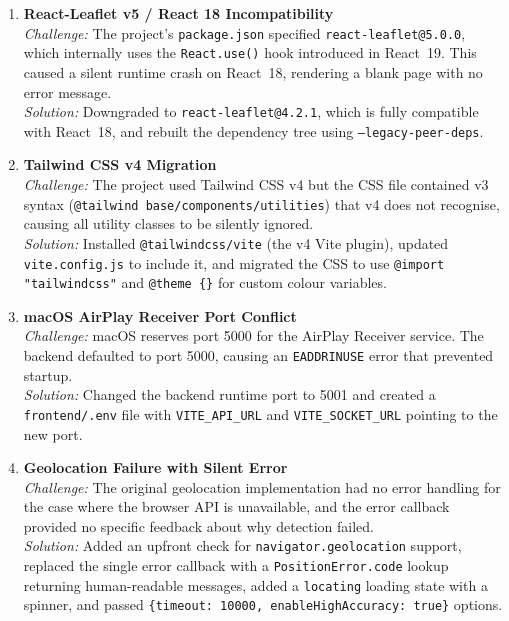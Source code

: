 \documentclass[12pt, a4paper]{report}
\begin{document}
\begin{enumerate}[leftmargin=*, label=\textbf{C\arabic*.}]

  \item \textbf{React-Leaflet v5 / React 18 Incompatibility}\\
  \textit{Challenge:} The project's \texttt{package.json} specified \texttt{react-leaflet@5.0.0}, which internally uses the \texttt{React.use()} hook introduced in React~19. This caused a silent runtime crash on React~18, rendering a blank page with no error message.\\[4pt]
  \textit{Solution:} Downgraded to \texttt{react-leaflet@4.2.1}, which is fully compatible with React~18, and rebuilt the dependency tree using \texttt{--legacy-peer-deps}.

  \item \textbf{Tailwind CSS v4 Migration}\\
  \textit{Challenge:} The project used Tailwind CSS v4 but the CSS file contained v3 syntax (\texttt{@tailwind base/components/utilities}) that v4 does not recognise, causing all utility classes to be silently ignored.\\[4pt]
  \textit{Solution:} Installed \texttt{@tailwindcss/vite} (the v4 Vite plugin), updated \texttt{vite.config.js} to include it, and migrated the CSS to use \texttt{@import "tailwindcss"} and \texttt{@theme \{\}} for custom colour variables.

  \item \textbf{macOS AirPlay Receiver Port Conflict}\\
  \textit{Challenge:} macOS reserves port 5000 for the AirPlay Receiver service. The backend defaulted to port 5000, causing an \texttt{EADDRINUSE} error that prevented startup.\\[4pt]
  \textit{Solution:} Changed the backend runtime port to 5001 and created a \texttt{frontend/.env} file with \texttt{VITE\_API\_URL} and \texttt{VITE\_SOCKET\_URL} pointing to the new port.

  \item \textbf{Geolocation Failure with Silent Error}\\
  \textit{Challenge:} The original geolocation implementation had no error handling for the case where the browser API is unavailable, and the error callback provided no specific feedback about why detection failed.\\[4pt]
  \textit{Solution:} Added an upfront check for \texttt{navigator.geolocation} support, replaced the single error callback with a \texttt{PositionError.code} lookup returning human-readable messages, added a \texttt{locating} loading state with a spinner, and passed \texttt{\{timeout: 10000, enableHighAccuracy: true\}} options.


\end{enumerate}
\end{document}

